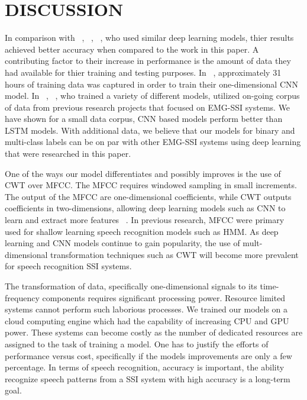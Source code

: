\documentclass{article}
\begin{document}
\section{DISCUSSION}
\label{sec:DISCUSSION}

In comparison with  ~\cite{janke_emg--speech:_2017}, ~\cite{kapur_alterego:_2018}, ~\cite{diener_session-independent_nodate}, who used similar deep learning models, thier results achieved better accuracy when compared to the work in this paper. A  contributing factor to their increase in performance is the amount of data they had available for thier training and testing purposes. In ~\cite{kapur_alterego:_2018}, approximately 31 hours of training data was captured in order to train their one-dimensional CNN model. In ~\cite{janke_emg--speech:_2017}, ~\cite{diener_session-independent_nodate}, who trained a variety of different models, utilized on-going corpus of data from previous research projects that focused on EMG-SSI systems. We have shown for a small data corpus, CNN based models perform better than LSTM models. With additional data, we believe that our models for binary and multi-class labels can be on par with other EMG-SSI systems using deep learning that were researched in this paper.

One of the ways our model differentiates and possibly improves is the use of CWT over MFCC. The MFCC requires windowed sampling in small increments. The output of the MFCC are one-dimensional coefficients, while CWT outputs coefficients in two-dimensions, allowing deep learning models such as CNN to learn and extract more features ~\cite{huzaifah_comparison_2017}. In previous research, MFCC were primary used for shallow learning speech recognition models such as HMM. As deep learning and CNN models continue to gain popularity, the use of mult-dimensional transformation techniques such as CWT will become more prevalent for speech recognition SSI systems. 

The transformation of data, specifically one-dimensional signals to its time-frequency components requires significant processing power. Resource limited systems cannot perform such laborious processes. We trained our models on a cloud computing engine which had the capability of increasing CPU and GPU power. These systems can become costly as the number of dedicated resources are assigned to the task of training a model. One has to justify the efforts of performance versus cost, specifically if the models improvements are only a few percentage. In terms of speech recognition, accuracy is important, the ability recognize speech patterns from a SSI system with high accuracy is a long-term goal.  
\end{document}
